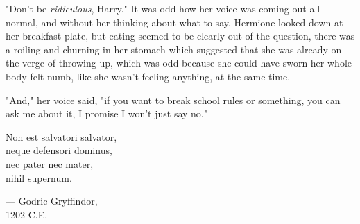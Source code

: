 "Don't be \emph{ridiculous}, Harry." It was odd how her voice was coming out
all normal, and without her thinking about what to say. Hermione looked down at
her breakfast plate, but eating seemed to be clearly out of the question, there
was a roiling and churning in her stomach which suggested that she was already
on the verge of throwing up, which was odd because she could have sworn her
whole body felt numb, like she wasn't feeling anything, at the same time.

"And," her voice said, "if you want to break school rules or something, you can
ask me about it, I promise I won't just say no."
\sbreak

\vspace*{-\baselineskip}
\begin{center}
Non est salvatori salvator,\\
neque defensori dominus,\\
nec pater nec mater,\\
nihil supernum.

--- Godric Gryffindor,\\
1202 C.E.
\end{center}

